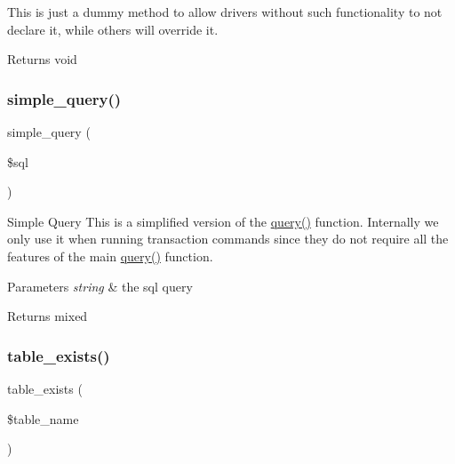 This is just a dummy method to allow drivers without such functionality to not declare it, while others will override it.

\begin{DoxyReturn}{Returns}
void 
\end{DoxyReturn}
\mbox{\label{class_c_i___d_b__driver_a6ac4d82d7ba4e8df07e1367229084c91}} 
\subsubsection{\texorpdfstring{simple\+\_\+query()}{simple\_query()}}
{\footnotesize\ttfamily simple\+\_\+query (\begin{DoxyParamCaption}\item[{}]{\$sql }\end{DoxyParamCaption})}

Simple Query This is a simplified version of the \mbox{\hyperlink{class_c_i___d_b__driver_a4711d63638a755f763352472063f0bbf}{query()}} function. Internally we only use it when running transaction commands since they do not require all the features of the main \mbox{\hyperlink{class_c_i___d_b__driver_a4711d63638a755f763352472063f0bbf}{query()}} function.


\begin{DoxyParams}{Parameters}
{\em string} & the sql query \\
\hline
\end{DoxyParams}
\begin{DoxyReturn}{Returns}
mixed 
\end{DoxyReturn}
\mbox{\label{class_c_i___d_b__driver_af148cb2cd5d490d2a480c0c741ceed03}} 
\subsubsection{\texorpdfstring{table\+\_\+exists()}{table\_exists()}}
{\footnotesize\ttfamily table\+\_\+exists (\begin{DoxyParamCaption}\item[{}]{\$table\+\_\+name }\end{DoxyParamCaption})}


